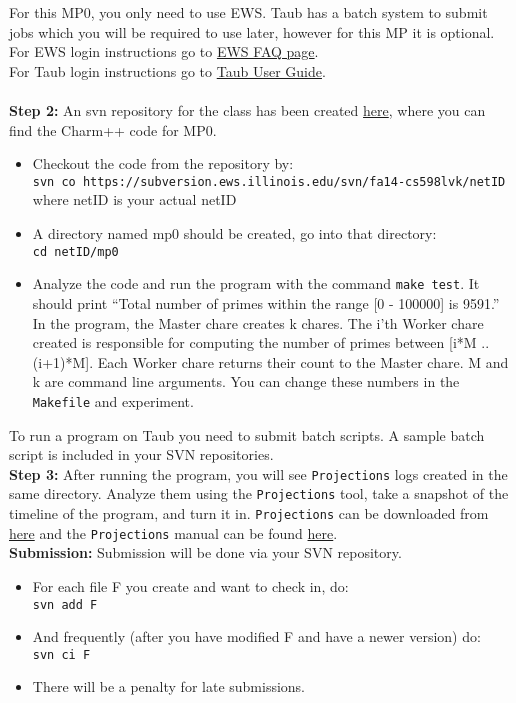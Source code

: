 \documentclass{article}
\begin{document}
For this MP0, you only need to use EWS. Taub has a batch
system to submit jobs which you will be required to use later, however for this MP
it is optional.\\
For EWS login instructions go to
\href{http://it.engineering.illinois.edu/ews/lab-information/ews-faq}{EWS FAQ page}.\\
For Taub login instructions go to
\href{https://campuscluster.illinois.edu/user\_info/doc/}{Taub User Guide}.\\
\\
\textbf{Step 2:} An svn repository for the class has been created
\href{https://subversion.ews.illinois.edu/svn/fa14-cs598lvk/}{here},
where you can find the Charm++ code for MP0.\\
\begin{itemize}
\item Checkout the code from the repository by:\\
        \texttt{svn co
        https://subversion.ews.illinois.edu/svn/fa14-cs598lvk/netID}\\
        where netID is your actual netID
\item A directory named mp0 should be created, go into that directory:\\
        \texttt{cd netID/mp0}
\item Analyze the code and run the program with the command \texttt{make test}.
It should print ``Total number of primes within the range [0 - 100000] is 9591.''
In the program, the Master chare creates k chares.
The i'th Worker chare created is responsible for computing the number of primes between [i*M .. (i+1)*M].
Each Worker chare returns their count to the Master chare.
M and k are command line arguments.
You can change these numbers in the \texttt{Makefile} and experiment.

\end{itemize}
    To run a program on Taub you need to submit batch scripts.
    A sample batch script is included in your SVN repositories.\\

\textbf{Step 3:}  After running the program, you will see \texttt{Projections}
logs created in the same directory.
Analyze them using the \texttt{Projections} tool,
take a snapshot of the timeline of the program, and turn it in.
\texttt{Projections} can be downloaded from \href{http://charm.cs.uiuc.edu/software}{here} and the
\texttt{Projections} manual can be found
\href{http://charm.cs.illinois.edu/manuals/html/projections/manual-1p.html}
{here}.\\

\textbf{Submission:}
Submission will be done via your SVN repository.
\begin{itemize}
\item  For each file F you create and want to check in, do:\\
        \texttt{svn add F}
\item  And frequently (after you have modified F and have a newer version) do:\\
        \texttt{svn ci F}
\item  There will be a penalty for late submissions.
\end{itemize}
\end{document}
